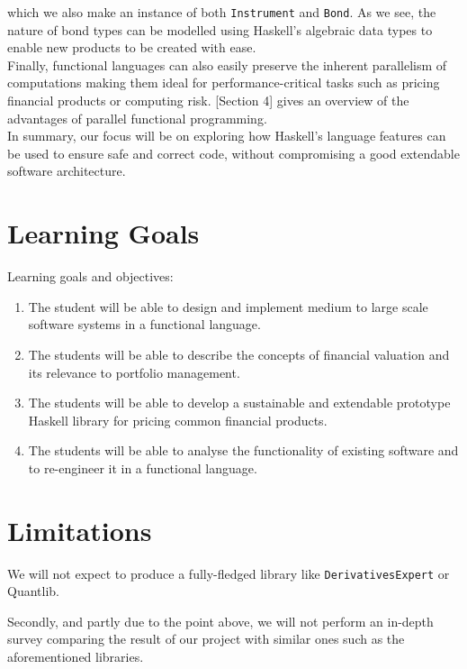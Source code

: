 \documentclass[11pt]{article}
\begin{document}
which we also make an instance of both {\tt Instrument} and {\tt Bond}.
As we see, the nature of bond types can be modelled using Haskell's algebraic
data types to enable new products to be created with ease.\\

Finally, functional languages can also easily preserve the inherent parallelism 
of computations making them ideal for performance-critical tasks such as pricing
financial products or computing risk. \cite{hiperfit2010}[Section 4] gives an
overview of the advantages of parallel functional programming.\\

In summary, our focus will be on exploring how Haskell's language features can be used
to ensure safe and correct code, without compromising a good extendable software architecture.

\section*{Learning Goals}

Learning goals and objectives:

\begin{enumerate}
\item The student will be able to design and implement medium to large scale software systems in a functional language. %
\item The students will be able to describe the concepts of financial valuation and its relevance to portfolio management. %
\item The students will be able to develop a sustainable and extendable prototype Haskell library for pricing common financial products. %
\item The students will be able to analyse the functionality of existing software and to re-engineer it in a functional language.
\end{enumerate}

\section*{Limitations}

We will not expect to produce a fully-fledged library like {\tt DerivativesExpert} or Quantlib\cite{Ame2003}.

Secondly, and partly due to the point above, we will not perform an in-depth survey
comparing the result of our project with similar ones such as the aforementioned libraries.\\
\end{document}
